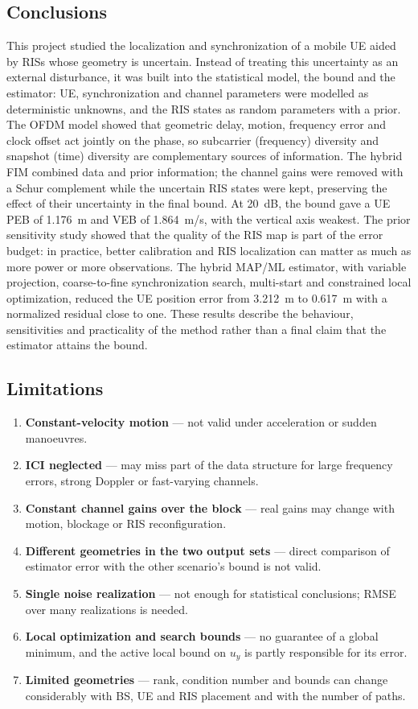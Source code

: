 \documentclass[11pt,a4paper]{article}
\begin{document}
\subsection{Conclusions}
This project studied the localization and synchronization of a mobile UE aided by RISs whose geometry is
uncertain. Instead of treating this uncertainty as an external disturbance, it was built into the statistical
model, the bound and the estimator: UE, synchronization and channel parameters were modelled as deterministic
unknowns, and the RIS states as random parameters with a prior. The OFDM model showed that geometric delay,
motion, frequency error and clock offset act jointly on the phase, so subcarrier (frequency) diversity and snapshot
(time) diversity are complementary sources of information. The hybrid FIM combined data and prior information; the
channel gains were removed with a Schur complement while the uncertain RIS states were kept, preserving the effect
of their uncertainty in the final bound. At 20~dB, the bound gave a UE PEB of 1.176~m and VEB of 1.864~m/s, with the
vertical axis weakest. The prior sensitivity study showed that the quality of the RIS map is part of the error
budget: in practice, better calibration and RIS localization can matter as much as more power or more observations.
The hybrid MAP/ML estimator, with variable projection, coarse-to-fine synchronization search, multi-start and
constrained local optimization, reduced the UE position error from 3.212~m to 0.617~m with a normalized residual
close to one. These results describe the behaviour, sensitivities and practicality of the method rather than a
final claim that the estimator attains the bound.

\subsection{Limitations}
\begin{enumerate}
\item \textbf{Constant-velocity motion} --- not valid under acceleration or sudden manoeuvres.
\item \textbf{ICI neglected} --- may miss part of the data structure for large frequency errors, strong Doppler or
fast-varying channels.
\item \textbf{Constant channel gains over the block} --- real gains may change with motion, blockage or RIS
reconfiguration.
\item \textbf{Different geometries in the two output sets} --- direct comparison of estimator error with the other
scenario's bound is not valid.
\item \textbf{Single noise realization} --- not enough for statistical conclusions; RMSE over many realizations is
needed.
\item \textbf{Local optimization and search bounds} --- no guarantee of a global minimum, and the active local
bound on $u_y$ is partly responsible for its error.
\item \textbf{Limited geometries} --- rank, condition number and bounds can change considerably with BS, UE and RIS
placement and with the number of paths.
\end{enumerate}
\end{document}
